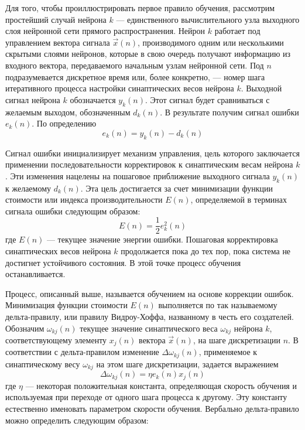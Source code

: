 Для того, чтобы проиллюстрировать первое правило обучения, рассмотрим простейший случай нейрона $k$ --- единственного вычислительного узла выходного слоя нейронной сети прямого распространения.
Нейрон $k$ работает под управлением вектора сигнала $\vec x (n)$, производимого одним или несколькими скрытыми слоями нейронов, которые в свою очередь получают информацию из входного вектора, передаваемого начальным узлам нейронной сети.
Под $n$ подразумевается дискретное время или, более конкретно, --- номер шага итеративного процесса настройки синаптических весов нейрона $k$.
Выходной сигнал нейрона $k$ обозначается $y_k(n)$.
Этот сигнал будет сравниваться с желаемым выходом, обозначенным $d_k(n)$.
В результате получим сигнал ошибки $e_k(n)$.
По определению
\begin{equation}
e_k(n) = y_k(n) - d_k(n)
\end{equation}

Сигнал ошибки инициализирует механизм управления, цель которого заключается применении последовательности корректировок к синаптическим весам нейрона $k$.
Эти изменения нацелены на пошаговое приближение выходного сигнала $y_k(n)$ к желаемому $d_k(n)$.
Эта цель достигается за счет минимизации функции стоимости или индекса производительности $E(n)$, определяемой в терминах сигнала ошибки следующим образом:
\begin{equation}
E(n) = \frac12 e_k^2(n)
\end{equation}
где $E(n)$ --- текущее значение энергии ошибки.
Пошаговая корректировка синаптических весов нейрона $k$  продолжается пока до тех пор, пока система не достигнет устойчивого состояния.
В этой точке процесс обучения останавливается.

Процесс, описанный выше, называется обучением на основе коррекции ошибок.
Минимизация функции стоимости $E(n)$ выполняется по так называемому дельта-правилу, или правилу Видроу-Хоффа, названному в честь его создателей.
Обозначим $\omega_{kj}(n)$  текущее значение синаптического веса $\omega_{kj}$ нейрона $k$, соответствующему элементу $x_j(n)$ вектора $\vec x(n)$, на шаге дискретизации $n$.
В соответствии с дельта-правилом изменение $\Delta\omega_{kj}(n)$, применяемое  к синаптическому весу $\omega_{kj}$ на этом шаге дискретизации, задается выражением
\begin{equation}
\Delta\omega_{kj}(n) = \eta e_k(n)x_j(n)
\end{equation}
где $\eta$ --- некоторая положительная константа, определяющая скорость обучения и используемая при переходе  от одного шага процесса к другому. 
Эту константу естественно именовать параметром скорости обучения.
Вербально дельта-правило можно определить следующим образом:


